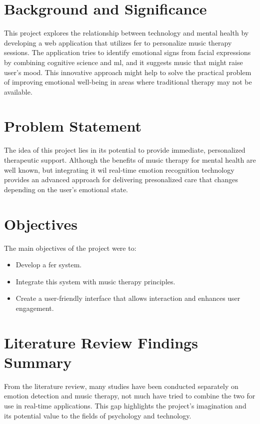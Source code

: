 \section{Background and Significance}
This project explores the relationship between technology and mental health by developing a web application that utilizes \gls{fer} to personalize music therapy sessions.
The application tries to identify emotional signs from facial expressions by combining cognitive science and \gls{ml}, and it suggests music that might raise user's mood.
This innovative approach might help to solve the practical problem of improving emotional well-being in areas where traditional therapy may not be available.

\section{Problem Statement}
The idea of this project lies in its potential to provide immediate, personalized therapeutic support.
Although the benefits of music therapy for mental health are well known, but integrating it wil real-time emotion recognition technology provides an advanced approach for delivering presonalized care that changes depending on the user's emotional state.

\section{Objectives}
The main objectives of the project were to:
\begin{itemize}
    \item Develop a \gls{fer} system.
    \item Integrate this system with music therapy principles.
    \item Create a user-friendly interface that allows interaction and enhances user engagement.
\end{itemize}

\section{Literature Review Findings Summary}
From the literature review, many studies have been conducted separately on emotion detection and music therapy, not much have tried to combine the two for use in real-time applications.
This gap highlights the project's imagination and its potential value to the fields of psychology and technology.

